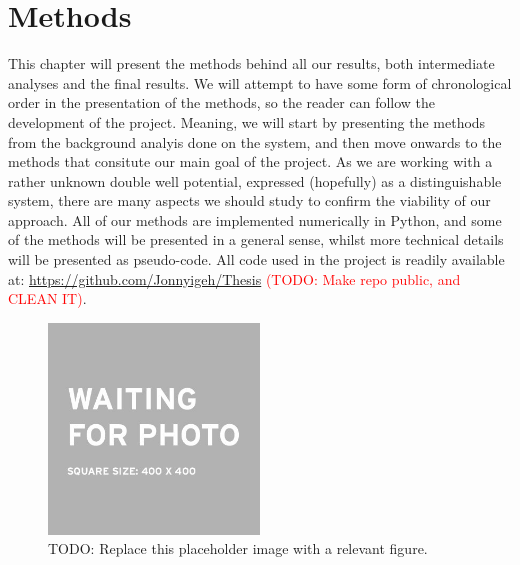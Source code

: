 \documentclass{subfiles}
\begin{document}
\chapter{Methods}
This chapter will present the methods behind all our results, both intermediate analyses and the final results. We will attempt to have some form of chronological order in the presentation of the methods, so the reader can follow the development of the project. Meaning, we will start by presenting the methods from the background analyis done on the system, and then move onwards to the methods that consitute our main goal of the project. As we are working with a rather unknown double well potential, expressed (hopefully) as a distinguishable system, there are many aspects we should study to confirm the viability of our approach. All of our methods are implemented numerically in Python, and some of the methods will be presented in a general sense, whilst more technical details will be presented as pseudo-code. All code used in the project is readily available at: \url{https://github.com/Jonnyigeh/Thesis} \textcolor{red}{(TODO: Make repo public, and CLEAN IT)}.
\begin{figure}
\centering
\includegraphics[width=0.5\textwidth]{figs/placeholder_image.jpeg}
\caption{TODO: Replace this placeholder image with a relevant figure. }
\label{fig:methods_intro}
\end{figure}





\end{document}
